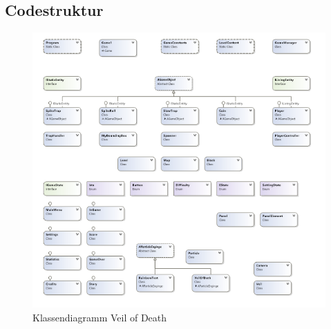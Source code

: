 \documentclass[10pt]{article}
\begin{document}
\vspace{0.5cm}
\subsection{Codestruktur}

\begin{figure}[H]
	\centering
	\includegraphics[width=1\textwidth]{classdiagramm.png}
	\caption{Klassendiagramm Veil of Death
		\label{fig:classdiagramm}}
\end{figure}
\end{document}
